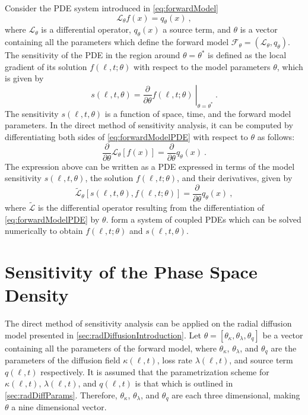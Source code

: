 Consider the PDE system introduced in \cref{eq:forwardModel} 
\begin{equation}\label{eq:forwardModelPDE}
    \mathcal{L}_{\theta} f(x)  = q_{\theta}(x) \ ,
\end{equation}
where $\mathcal{L}_{\theta}$ is a differential operator, $q_{\theta}(x)$ a source term, and 
$\theta$ is a vector containing all the parameters which define the forward model 
$\mathcal{F}_{\theta} = (\mathcal{L}_{\theta}, q_{\theta})$. The sensitivity of the PDE in the 
region around $\theta = \theta^{\ast}$ is defined as the local gradient of its solution 
$f(\ell, t; \theta)$ with respect to the model parameters $\theta$, which is given by 
\[
    s(\ell, t, \theta) =  
    \left. \frac{\partial}{\partial \theta}f(\ell, t; \theta) \ 
    \right\rvert_{\theta = \theta^{\ast}} \ .
\] 
%
The sensitivity $s(\ell, t, \theta)$ is a function of space, time, and the forward model 
parameters. In the direct method of sensitivity analysis, it can be computed by differentiating 
both sides of \cref{eq:forwardModelPDE} with respect to $\theta$ as follows:  
\[
    \frac{\partial}{\partial{\theta}} \mathcal{L}_{\theta}[f(x)] = 
        \frac{\partial}{\partial{\theta}} q_{\theta}(x) \ .
\] 
The expression above can be written as a PDE expressed in terms of the model sensitivity 
$s(\ell, t, \theta)$, the solution $f(\ell, t; \theta)$, and their derivatives, given by 
\begin{equation}\label{eq:forwardModelSens}
   \tilde{\mathcal{L}}_{\theta}[s(\ell, t, \theta), f(\ell, t; \theta)] = 
    \frac{\partial}{\partial{\theta}} q_{\theta}(x) \ ,
\end{equation}
%
where $\tilde{\mathcal{L}}$ is the differential operator resulting from the differentiation of 
\cref{eq:forwardModelPDE} by $\theta$.
%
 form a system of coupled PDEs which can be 
solved numerically to obtain $f(\ell, t; \theta)$ and $s(\ell, t, \theta)$.

\section*{Sensitivity of the Phase Space Density}

The direct method of sensitivity analysis can be applied on the radial diffusion model presented 
in \cref{sec:radDiffusionIntroduction}. Let 
$\theta = [\theta_{\kappa}, \theta_{\lambda}, \theta_{q}]$ be a vector containing all the 
parameters of the forward model, where $\theta_{\kappa}$, $\theta_{\lambda}$, and $\theta_{q}$ are 
the parameters of the diffusion field $\kappa(\ell, t)$, loss rate $\lambda(\ell, t)$, and 
source term $q(\ell, t)$ respectively. It is assumed that the parametrization scheme for 
$\kappa(\ell, t)$, $\lambda(\ell, t)$, and $q(\ell, t)$ is that which is outlined in 
\cref{sec:radDiffParams}. Therefore, $\theta_{\kappa}$, $\theta_{\lambda}$, and $\theta_{q}$ are 
each three dimensional, making $\theta$ a nine dimensional vector.

